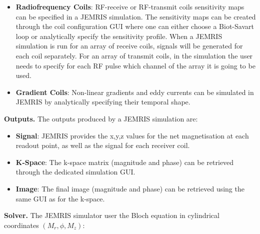 \begin{itemize}
    \item \textbf{Radiofrequency Coils}: RF-receive or RF-transmit coils sensitivity maps can be specified in a JEMRIS simulation. 
    The sensitivity maps can be created through the coil configuration GUI where one can either choose a Biot-Savart loop or analytically specify the sensitivity profile.
    When a JEMRIS simulation is run for an array of receive coils, signals will be generated for each coil separately.
    For an array of transmit coils, in the simulation the user needs to specify for each RF pulse which channel of the array it is going to be used.
    
    \item \textbf{Gradient Coils}: Non-linear gradients and eddy currents can be simulated in JEMRIS by analytically specifying their temporal shape.
    
\end{itemize}


\hfill

\textbf{Outputs.} The outputs produced by a JEMRIS simulation are:
\begin{itemize}
    
    \item \textbf{Signal}: JEMRIS provides the x,y,z values for the net magnetisation at each readout point, as well as the signal for each receiver coil. 
    
    \item \textbf{K-Space}: The k-space matrix (magnitude and phase) can be retrieved through the dedicated simulation GUI.
    
    \item \textbf{Image}: The final image (magnitude and phase) can be retrieved using the same GUI as for the k-space.
    
\end{itemize}

\hfill

\textbf{Solver.} The JEMRIS simulator user the Bloch equation 
in cylindrical coordinates $(M_r, \phi, M_z)$:

